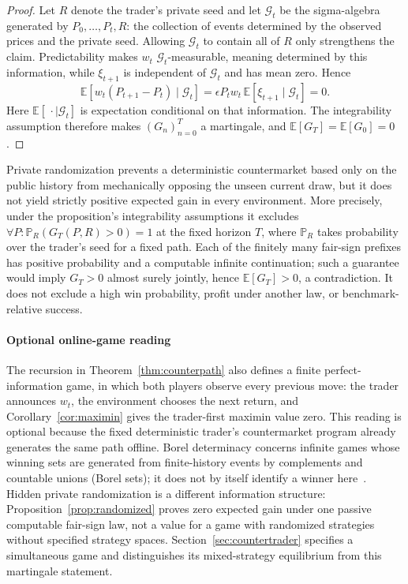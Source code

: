 \documentclass[aps,pra,reprint,superscriptaddress,amsmath,amssymb,floatfix]{revtex4-2}
\theoremstyle{plain}
\theoremstyle{definition}
\theoremstyle{remark}
\begin{document}
\begin{proof}
Let \(R\) denote the trader's private seed and
let \(\mathcal G_t\) be the sigma-algebra generated by
\(P_0,\ldots,P_t,R\): the collection of events determined by the
observed prices and the private seed. Allowing
\(\mathcal G_t\) to contain all of \(R\) only strengthens the claim.
Predictability makes \(w_t\) \(\mathcal G_t\)-measurable, meaning determined
by this information, while \(\xi_{t+1}\) is independent of
\(\mathcal G_t\) and has mean zero. Hence
\[
 \mathbb E\!\left[
   w_t(P_{t+1}-P_t)\mid\mathcal G_t
 \right]
 =\epsilon P_t w_t\,
   \mathbb E[\xi_{t+1}\mid\mathcal G_t]
 =0.
\]
Here \(\mathbb E[\,\cdot\mid\mathcal G_t]\) is expectation conditional on
that information. The integrability assumption therefore makes \((G_n)_{n=0}^T\) a martingale,
and \(\mathbb E[G_T]=\mathbb E[G_0]=0\).
\end{proof}

Private randomization prevents a deterministic countermarket based only on the
public history from mechanically opposing the unseen current draw, but it does
not yield strictly positive expected gain in every environment. More precisely,
under the proposition's integrability assumptions it excludes
\(\forall P:\mathbb P_R(G_T(P,R)>0)=1\) at the fixed horizon \(T\), where
\(\mathbb P_R\) takes probability over the trader's seed for a fixed path.
Each of the finitely many fair-sign prefixes has positive probability and a
computable infinite continuation; such a guarantee would imply
\(G_T>0\) almost surely jointly, hence \(\mathbb E[G_T]>0\), a contradiction.
It does not exclude a high win probability, profit under another law, or
benchmark-relative success.

\paragraph{Optional online-game reading}

The recursion in Theorem~\ref{thm:counterpath} also defines a finite
perfect-information game, in which both players observe every previous move:
the trader announces \(w_t\), the environment chooses
the next return, and Corollary~\ref{cor:maximin} gives the trader-first maximin
value zero. This reading is optional because the fixed deterministic trader's
countermarket program already generates the same path offline. Borel
determinacy concerns infinite games whose winning sets are generated from
finite-history events by complements and countable unions (Borel sets); it
does not by itself identify a winner here~\cite{Martin1975}. Hidden private randomization is
a different information structure: Proposition~\ref{prop:randomized} proves
zero expected gain under one passive computable fair-sign law, not a value
for a game with randomized strategies without specified strategy spaces.
Section~\ref{sec:countertrader} specifies a simultaneous game and
distinguishes its mixed-strategy equilibrium from this martingale statement.
\end{document}
